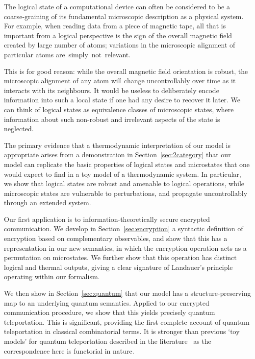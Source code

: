 \documentclass[a4paper,12pt]{article}
\theoremstyle{definition}
\renewcommand{\-}[0]{\nobreakdash-\hspace{0pt}}
\begin{document}
The logical state of a computational device can often be considered to be a coarse-graining of its fundamental microscopic description as a physical system. For example, when reading data from a piece of magnetic tape, all that is important from a logical perspective is the sign of the overall magnetic field created by large number of atoms; variations in the microscopic alignment of particular atoms \mbox{are simply not relevant.}

This is for good reason: while the overall magnetic field orientation is robust, the microscopic alignment of any atom will change uncontrollably over time as it interacts with its neighbours. It would be useless to deliberately encode information into such a local state if one had any desire to recover it later. We can think of logical states as equivalence classes of microscopic states, where information about such non-robust and irrelevant aspects of the state is neglected.

The primary evidence that a thermodynamic interpretation of our model is appropriate arises from a demonstration in Section~\ref{sec:2category} that our model can replicate the basic properties of logical states and microstates that one would expect to find in a toy model of a thermodynamic system. In particular, we show that logical states are robust and amenable to logical operations, while microscopic states are vulnerable to perturbations, and propagate uncontrollably through an extended system.

Our first application is to information-theoretically secure encrypted communication. We develop in Section~\ref{sec:encryption} a syntactic definition of encryption based on complementary observables, and show that this has a representation in our new semantics, in which the encryption operation acts as a permutation on microstates. We further show that this operation has distinct logical and thermal outputs, giving a clear signature of Landauer's principle operating within our formalism.

We then show in Section~\ref{sec:quantum} that our model has a structure-preserving map to an underlying quantum semantics. Applied to our encrypted communication procedure, we show that this yields precisely quantum teleportation. This is significant, providing the first complete account of quantum teleportation in classical combinatorial terms. It  is stronger than previous `toy models' for quantum teleportation described in the literature~\cite{ce08-tqc, cp01-cae, osw05-can, s04-dev, sv13-bsnc} as the correspondence here is functorial in nature.
\end{document}
